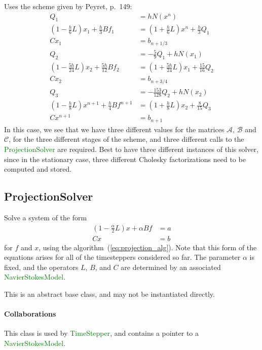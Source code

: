 \documentclass[11pt]{article}
\def\class#1{\textcolor{green}{\ttfamily\small #1}} %
\begin{document}
Uses the scheme given by Peyret, p.~149\cite{Peyret:2002}:
\begin{align}
	Q_1 &= hN(x^n)\\
	(1-\frac{h}{6}L)x_1 + \frac{h}{3}Bf_1 &= (1+\frac{h}{6}L)x^n + \frac{h}{3}Q_1\\
	Cx_1 &= b_{n+1/3}\\
	Q_2 &= -\frac{5}{9} Q_1 + hN(x_1)\\
	(1-\frac{5h}{24}L)x_2 + \frac{5h}{12}Bf_2 &= (1+\frac{5h}{24}L)x_1 + \frac{15}{16}Q_2\\
	Cx_2 &= b_{n+3/4}\\
	Q_3 &= -\frac{153}{128} Q_2 + hN(x_2)\\
	(1-\frac{h}{8}L)x^{n+1} + \frac{h}{4}Bf^{n+1} &= (1+\frac{h}{8}L)x_2 + \frac{8}{15}Q_3\\
	Cx^{n+1} &= b_{n+1}
\end{align}
In this case, we see that we have three different values for the matrices $\mathcal{A}$, $\mathcal{B}$ and $\mathcal{C}$, for the three different stages of the scheme, and three different calls to the \class{ProjectionSolver} are required.  Best to have three different instances of this solver, since in the stationary case, three different Cholesky factorizations need to be computed and stored.

\subsection{ProjectionSolver}
Solve a system of the form
\begin{equation}
\begin{aligned}
	(1 - \frac{\alpha}{2}L)x + \alpha Bf &= a\\
	Cx &= b
\end{aligned}
\label{eq:projection_specific}
\end{equation}
for $f$ and $x$, using the algorithm~(\ref{eq:projection_alg}).  Note that this form of the equations arises for all of the timesteppers considered so far.  The parameter $\alpha$ is fixed, and the operators $L$, $B$, and $C$ are determined by an associated \class{NavierStokesModel}.

This is an abstract base class, and may not be instantiated directly.

\paragraph{Collaborations}
This class is used by \class{TimeStepper}, and contains a pointer to a \class{NavierStokesModel}.
\end{document}
